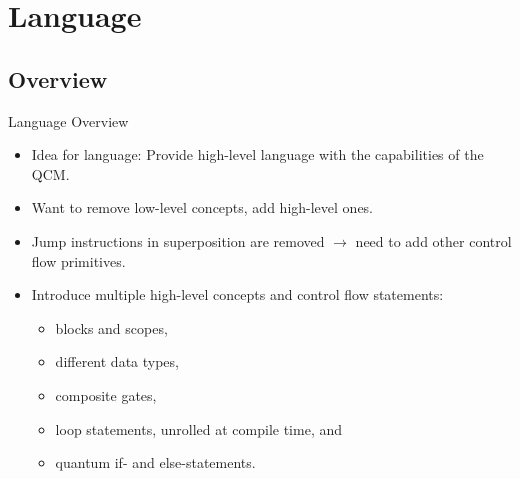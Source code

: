 \section{Language}
\subsection{Overview}
\begin{frame}{Language Overview}
    \begin{itemize}
        \item Idea for language: Provide high-level language with the capabilities of the QCM. 
        \item Want to remove low-level concepts, add high-level ones.
        \item Jump instructions in superposition are removed $\to$ need to add other control flow primitives.
        \item Introduce multiple high-level concepts and control flow statements:
        \begin{itemize}
            \item blocks and scopes,
            \item different data types,
            \item composite gates,
            \item loop statements, unrolled at compile time, and
            \item quantum if- and else-statements.
        \end{itemize}
    \end{itemize}
\end{frame}

